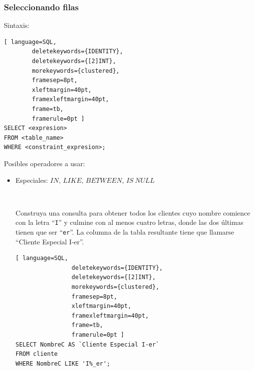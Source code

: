 \documentclass[
	10pt, %
	aspectratio=169, %
]{beamer}
\begin{document}
\begin{frame}[fragile]
	
	\frametitle{Seleccionando filas}
	
	Sintaxis:
	\begin{lstlisting}[ language=SQL,
		deletekeywords={IDENTITY},
		deletekeywords={[2]INT},
		morekeywords={clustered},
		framesep=8pt,
		xleftmargin=40pt,
		framexleftmargin=40pt,
		frame=tb,
		framerule=0pt ]
SELECT <expresion>
FROM <table_name>
WHERE <constraint_expresion>;
\end{lstlisting} 
	
	Posibles operadores a usar: 
	\begin{itemize}
		
		\item Especiales: $IN$, $LIKE$, $BETWEEN$, $IS\ NULL$
		
		\pause 
		
		\ 
		
		Construya una consulta para obtener todos los clientes cuyo nombre comience con la letra ``\texttt{I}'' y culmine con al menos cuatro letras, donde las dos últimas tienen que ser ``\texttt{er}''. La columna de la tabla resultante tiene que llamarse ``Cliente Especial I-er''.
		
		\pause
		
			\begin{lstlisting}[ language=SQL,
				deletekeywords={IDENTITY},
				deletekeywords={[2]INT},
				morekeywords={clustered},
				framesep=8pt,
				xleftmargin=40pt,
				framexleftmargin=40pt,
				frame=tb,
				framerule=0pt ]
SELECT NombreC AS `Cliente Especial I-er`
FROM cliente 
WHERE NombreC LIKE 'I%_er';
\end{lstlisting}
			
	\end{itemize}
	
\end{frame}

\end{document}
